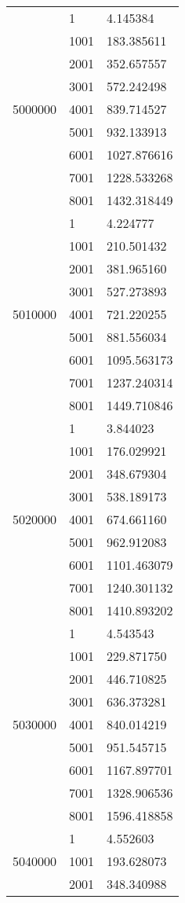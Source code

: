 \begin{table}[htb!]
\begin{tabular}{lll}
\multirow[c]{9}{*}{5000000} & 1 & 4.145384 \\
 & 1001 & 183.385611 \\
 & 2001 & 352.657557 \\
 & 3001 & 572.242498 \\
 & 4001 & 839.714527 \\
 & 5001 & 932.133913 \\
 & 6001 & 1027.876616 \\
 & 7001 & 1228.533268 \\
 & 8001 & 1432.318449 \\
\multirow[c]{9}{*}{5010000} & 1 & 4.224777 \\
 & 1001 & 210.501432 \\
 & 2001 & 381.965160 \\
 & 3001 & 527.273893 \\
 & 4001 & 721.220255 \\
 & 5001 & 881.556034 \\
 & 6001 & 1095.563173 \\
 & 7001 & 1237.240314 \\
 & 8001 & 1449.710846 \\
\multirow[c]{9}{*}{5020000} & 1 & 3.844023 \\
 & 1001 & 176.029921 \\
 & 2001 & 348.679304 \\
 & 3001 & 538.189173 \\
 & 4001 & 674.661160 \\
 & 5001 & 962.912083 \\
 & 6001 & 1101.463079 \\
 & 7001 & 1240.301132 \\
 & 8001 & 1410.893202 \\
\multirow[c]{9}{*}{5030000} & 1 & 4.543543 \\
 & 1001 & 229.871750 \\
 & 2001 & 446.710825 \\
 & 3001 & 636.373281 \\
 & 4001 & 840.014219 \\
 & 5001 & 951.545715 \\
 & 6001 & 1167.897701 \\
 & 7001 & 1328.906536 \\
 & 8001 & 1596.418858 \\
\multirow[c]{9}{*}{5040000} & 1 & 4.552603 \\
 & 1001 & 193.628073 \\
 & 2001 & 348.340988 \\

\end{tabular}
\end{table}
